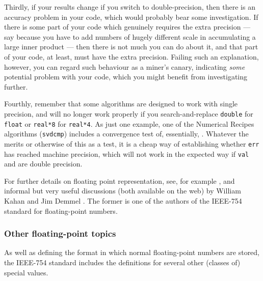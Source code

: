 \documentclass[11pt,oneside,chapters]{starlink}
\begin{document}
Thirdly, if your results change if you switch to
double-precision, then there is an accuracy problem in
your code, which would probably bear some investigation.
If there is some part of your code which genuinely
requires the extra precision --- say because you have to
add numbers of hugely different scale in accumulating a
large inner product --- then there is not much you can do
about it, and that part of your code, at least, must
have the extra precision.  Failing such an explanation,
however, you can regard such behaviour as a miner's
canary, indicating \emph{some} potential problem with
your code, which you might benefit from investigating
further.

Fourthly, remember that some algorithms
are designed to work with single precision, and will no
longer work properly if you search-and-replace
\texttt{double} for \texttt{float} or
\texttt{real*8} for \texttt{real*4}.  As just
one example, one of the Numerical Recipes algorithms
(\texttt{svdcmp}) includes a convergence test of,
essentially, .  Whatever
the merits or otherwise of this as a test, it is a cheap
way of establishing whether \texttt{err} has reached
machine precision, which will not work in the expected
way if \texttt{val} and  are double
precision.

For further details on floating point
representation, see, for example
\citet{hauser96}, and informal but very
useful discussions (both available on the web) by
William Kahan \citep{kahan96} and Jim
Demmel \citep{demmel}.  The former is one
of the authors of the IEEE-754 standard for
floating-point numbers.

\subsubsection{Other floating-point topics}
\label{s:otherfloat}

As well as defining the format in which normal floating-point numbers are
stored, the IEEE-754 standard includes the definitions for several
other (classes of) special values.
\end{document}
